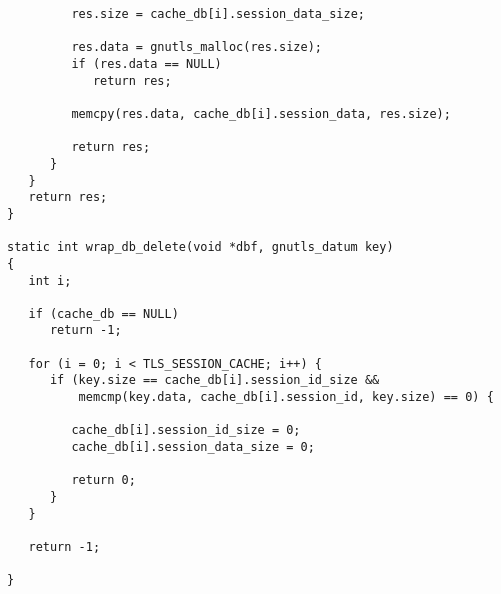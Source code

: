 \begin{verbatim}
         res.size = cache_db[i].session_data_size;

         res.data = gnutls_malloc(res.size);
         if (res.data == NULL)
            return res;

         memcpy(res.data, cache_db[i].session_data, res.size);

         return res;
      }
   }
   return res;
}

static int wrap_db_delete(void *dbf, gnutls_datum key)
{
   int i;

   if (cache_db == NULL)
      return -1;

   for (i = 0; i < TLS_SESSION_CACHE; i++) {
      if (key.size == cache_db[i].session_id_size &&
          memcmp(key.data, cache_db[i].session_id, key.size) == 0) {

         cache_db[i].session_id_size = 0;
         cache_db[i].session_data_size = 0;

         return 0;
      }
   }

   return -1;

}

\end{verbatim}
